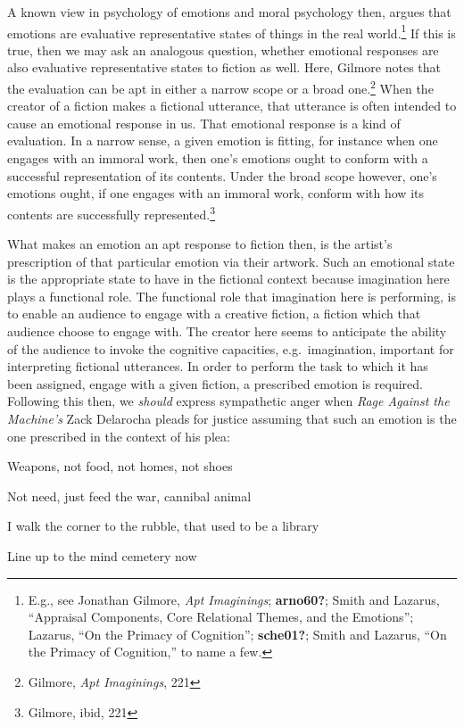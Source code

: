 \documentclass[
  12pt,
]{book}
\theoremstyle{definition}
\theoremstyle{definition}
\theoremstyle{definition}
\theoremstyle{definition}
\theoremstyle{remark}
\begin{document}
A known view in psychology of emotions and moral psychology then, argues that emotions are evaluative representative states of things in the real world.\footnote{E.g., see Jonathan Gilmore, \emph{Apt {Imaginings}}; \textbf{arno60?}; Smith and Lazarus, {``Appraisal {Components}, {Core Relational Themes}, and the {Emotions}''}; Lazarus, {``On the {Primacy} of {Cognition}''}; \textbf{sche01?}; Smith and Lazarus, {``On the {Primacy} of {Cognition},''} to name a few.} If this is true, then we may ask an analogous question, whether emotional responses are also evaluative representative states to fiction as well. Here, Gilmore notes that the evaluation can be apt in either a narrow scope or a broad one.\footnote{Gilmore, \emph{Apt {Imaginings}}, 221} When the creator of a fiction makes a fictional utterance, that utterance is often intended to cause an emotional response in us. That emotional response is a kind of evaluation. In a narrow sense, a given emotion is fitting, for instance when one engages with an immoral work, then one's emotions ought to conform with a successful representation of its contents. Under the broad scope however, one's emotions ought, if one engages with an immoral work, conform with how its contents are successfully represented.\footnote{Gilmore, ibid, 221}

What makes an emotion an apt response to fiction then, is the artist's prescription of that particular emotion via their artwork. Such an emotional state is the appropriate state to have in the fictional context because imagination here plays a functional role. The functional role that imagination here is performing, is to enable an audience to engage with a creative fiction, a fiction which that audience choose to engage with. The creator here seems to anticipate the ability of the audience to invoke the cognitive capacities, e.g.~imagination, important for interpreting fictional utterances. In order to perform the task to which it has been assigned, engage with a given fiction, a prescribed emotion is required. Following this then, we \emph{should} express sympathetic anger when \emph{Rage Against the Machine's} Zack Delarocha pleads for justice assuming that such an emotion is the one prescribed in the context of his plea:

Weapons, not food, not homes, not shoes

Not need, just feed the war, cannibal animal

I walk the corner to the rubble, that used to be a library

Line up to the mind cemetery now
\end{document}
